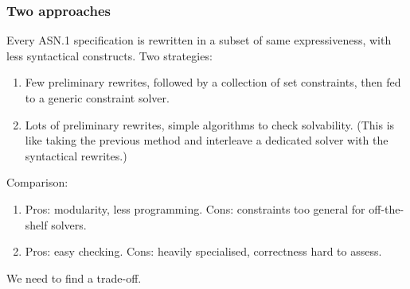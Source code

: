 \documentclass[compress,dvips,xcolor={dvipsnames},t]{beamer}
\newcommand\ASN{\textsf{ASN.1}\xspace}
\begin{document}
\begin{frame}
\frametitle{Two approaches}

Every \ASN specification is rewritten in a subset of same
expressiveness, with less syntactical constructs. Two strategies:

\begin{enumerate}

  \item Few preliminary rewrites, followed by a collection of set
  constraints, then fed to a generic constraint solver.

  \item Lots of preliminary rewrites, simple algorithms to check
    solvability. (This is like taking the previous method and
    interleave a dedicated solver with the syntactical rewrites.)

\end{enumerate}
Comparison:
\begin{enumerate}

\item Pros: modularity, less programming. Cons: constraints too
  general for off-the-shelf solvers.

  \item Pros: easy checking. Cons: heavily specialised, correctness
    hard to assess.

\end{enumerate}
We need to find a trade-off.

\end{frame}
\end{document}
